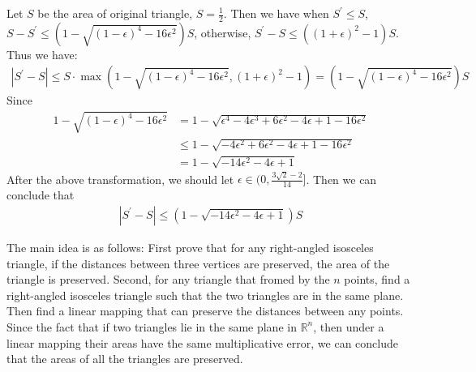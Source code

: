 Let $S$ be the area of original triangle, $S=\frac{1}{2}$.
Then we have 
when $S^{\prime}\le S$, $S-S^{\prime}\le (1-\sqrt{(1-\epsilon)^4-16\epsilon^2})S$,
otherwise, $S^{\prime}-S \le ((1+\epsilon)^2-1)S$.
Thus we have:
\begin{align}
    \nonumber |S^{\prime}-S|\le S \cdot \max(1-\sqrt{(1-\epsilon)^4-16\epsilon^2}, (1+\epsilon)^2-1)=(1-\sqrt{(1-\epsilon)^4-16\epsilon^2})S
\end{align}
Since 
\begin{align}
    \nonumber 1-\sqrt{(1-\epsilon)^4-16\epsilon^2} 
    &= 1-\sqrt{\epsilon^4-4\epsilon^3+6\epsilon^2-4\epsilon+1-16\epsilon^2}\\
    \nonumber &\le 1-\sqrt{-4\epsilon^2+6\epsilon^2-4\epsilon+1-16\epsilon^2}\\
    \nonumber &= 1-\sqrt{-14\epsilon^2-4\epsilon+1}
\end{align}
After the above transformation, we should let $\epsilon \in (0,\frac{3\sqrt{2}-2}{14}]$.
Then we can conclude that 
\begin{align}
    \nonumber |S^{\prime}-S|\le (1-\sqrt{-14\epsilon^2-4\epsilon+1})S
\end{align}


The main idea is as follows:
First prove that for any right-angled isosceles triangle, if the distances between three vertices are preserved, the area of the triangle is preserved.
Second, for any triangle that fromed by the $n$ points, find a right-angled isosceles triangle such that the two triangles are in the same plane.
Then find a linear mapping that can preserve the distances between any points.
Since the fact that if two triangles lie in the same plane in $\mathbb{R}^n$, 
then under a linear mapping their areas have the same multiplicative error, we can conclude that the areas of all the triangles are preserved.

